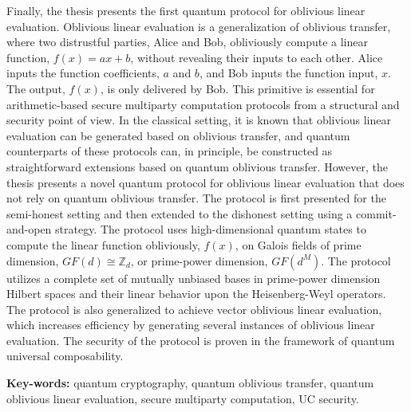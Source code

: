 Finally, the thesis presents the first quantum protocol for oblivious linear evaluation. Oblivious linear evaluation is a generalization of oblivious transfer, where two distrustful parties, Alice and Bob, obliviously compute a linear function, $f(x) = ax + b$, without revealing their inputs to each other. Alice inputs the function coefficients, $a$ and $b$, and Bob inputs the function input, $x$. The output, $f(x)$, is only delivered by Bob. This primitive is essential for arithmetic-based secure multiparty computation protocols from a structural and security point of view. In the classical setting, it is known that oblivious linear evaluation can be generated based on oblivious transfer, and quantum counterparts of these protocols can, in principle, be constructed as straightforward extensions based on quantum oblivious transfer. However, the thesis presents a novel quantum protocol for oblivious linear evaluation that does not rely on quantum oblivious transfer. The protocol is first presented for the semi-honest setting and then extended to the dishonest setting using a commit-and-open strategy. The protocol uses high-dimensional quantum states to compute the linear function obliviously, $f(x)$, on Galois fields of prime dimension, $GF(d) \cong \mathbb{Z}_d$, or prime-power dimension, $GF(d^M)$. The protocol utilizes a complete set of mutually unbiased bases in prime-power dimension Hilbert spaces and their linear behavior upon the Heisenberg-Weyl operators. The protocol is also generalized to achieve vector oblivious linear evaluation, which increases efficiency by generating several instances of oblivious linear evaluation. The security of the protocol is proven in the framework of quantum universal composability.

\vfill

\begin{flushleft}
\textbf{Key-words:} quantum cryptography, quantum oblivious transfer, quantum oblivious linear evaluation, secure multiparty computation, UC security.
\end{flushleft}
